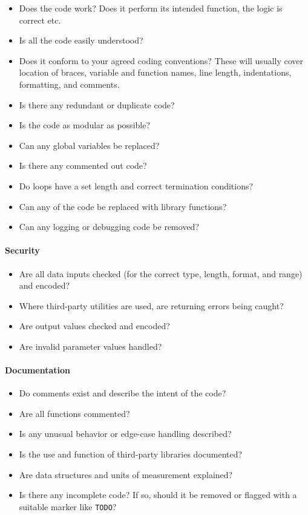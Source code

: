 \begin{itemize}
\item Does the code work? Does it perform its intended function, the logic is correct etc.
\item Is all the code easily understood?
\item Does it conform to your agreed coding conventions? These will usually cover location of braces, variable and function names, line length, indentations, formatting, and comments.
\item Is there any redundant or duplicate code?
\item Is the code as modular as possible?
\item Can any global variables be replaced?
\item Is there any commented out code?
\item Do loops have a set length and correct termination conditions?
\item Can any of the code be replaced with library functions?
\item Can any logging or debugging code be removed?
\end{itemize}

\paragraph{Security}

\begin{itemize}
\item Are all data inputs checked (for the correct type, length, format, and range) and encoded?
\item Where third-party utilities are used, are returning errors being caught?
\item Are output values checked and encoded?
\item Are invalid parameter values handled?
\end{itemize}

\paragraph{Documentation}

\begin{itemize}
\item Do comments exist and describe the intent of the code?
\item Are all functions commented?
\item Is any unusual behavior or edge-case handling described?
\item Is the use and function of third-party libraries documented?
\item Are data structures and units of measurement explained?
\item Is there any incomplete code? If so, should it be removed or flagged with a suitable marker like \texttt{TODO}?
\end{itemize}

